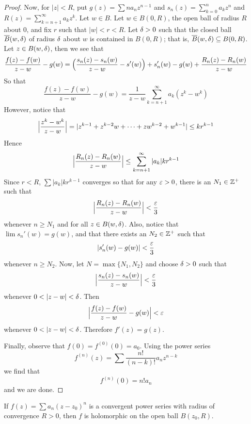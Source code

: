 \begin{proof}
    Now, for $|z|<R$, put  $g(z)=\sum{na_nz^{n-1}}$ and
    $s_n(z)=\sum_{k=0}^n{a_kz^n}$ and $R(z)=\sum_{k=n+1}^\infty{a_kz^k}$. Let $w
    \in B$. Let  $w \in B(0,R)$, the open ball of radius $R$ about $0$, and fix
    $r$ such that $|w|<r<R$. Let $\delta>0$ such that the closed ball
    $\overline{B}(w,\delta)$ of radius $\delta$ about  $w$ is contained in  $B(0,R)$; that
    is, $\overline{B}(w,\delta) \subseteq B(0,R)$. Let $z \in B(w,\delta)$, then we see that
    \begin{equation*}
        \frac{f(z)-f(w)}{z-w}-g(w)=\Big{(} \frac{s_n(z)-s_n(w)}{z-w}-s'(w) \Big{)}
        +s_n'(w)-g(w)+\frac{R_n(z)-R_n(w)}{z-w}
    \end{equation*}
    So that
    \begin{equation*}
        \frac{f(z)-f(w)}{z-w}-g(w)=\frac{1}{z-w}\sum_{k=n+1}^\infty{a_k(z^k-w^k)}
    \end{equation*}
    However, notice that
    \begin{equation*}
        \Big{|} \frac{z^k-w^k}{z-w}
        \Big{|}=|z^{k-1}+z^{k-2}w+\dots+zw^{k-2}+w^{k-1}| \leq kr^{k-1}
    \end{equation*}
    Hence
    \begin{equation*}
    \Big{|} \frac{R_n(z)-R_n(w)}{z-w} \Big{|} \leq
    \sum_{k=n+1}^\infty{|a_k|kr^{k-1}}
    \end{equation*}
    Since $r<R$,  $\sum{|a_k|kr^{k-1}}$ converges so that for any $\varepsilon>0$, there
    is an  $N_1 \in \mathbb{Z}^+$ such that
    \begin{equation*}
        \Big{|} \frac{R_n(z)-R_n(w)}{z-w} \Big{|}<\frac{\varepsilon}{3}
    \end{equation*}
    whenever $n \geq N_1$ and for all $z \in B(w,\delta)$. Also, notice that
    $\lim{s_n'(w)}=g(w)$, and that there exists an $N_2 \in \mathbb{Z}^+$ such that
    \begin{equation*}
        |s_n'(w)-g(w)|<\frac{\varepsilon}{3}
    \end{equation*}
    whenever $n \geq N_2$. Now, let $N=\max{\{N_1,N_2\}}$ and choose $\delta>0$ such
    that
    \begin{equation*}
        \Big{|} \frac{s_n(z)-s_n(w)}{z-w} \Big{|}<\frac{\varepsilon}{3}
    \end{equation*}
    whenever $0<|z-w|<\d$. Then
    \begin{equation*}
        \Big{|} \frac{f(z)-f(w)}{z-w}-g(w) \Big{|}<\varepsilon
    \end{equation*}
    whenever $0<|z-w|<\d$. Therefore  $f'(z)=g(z)$.

    Finally, observe that $f(0)=f^{(0)}(0)=a_0$. Using the power series
    \begin{equation*}
        f^{(n)}(z)=\sum{\frac{n!}{(n-k)!}a_nz^{n-k}}
    \end{equation*}
    we find that
    \begin{equation*}
        f^{(n)}(0)=n!a_n
    \end{equation*}
    and we are done.
\end{proof}
\begin{corollary}
    If $f(z)=\sum{a_n(z-z_0)^n}$ is a convergent power series with radius of
    convergence $R>0$, then $f$ is holomorphic on the open ball $B(z_0,R)$.
\end{corollary}

